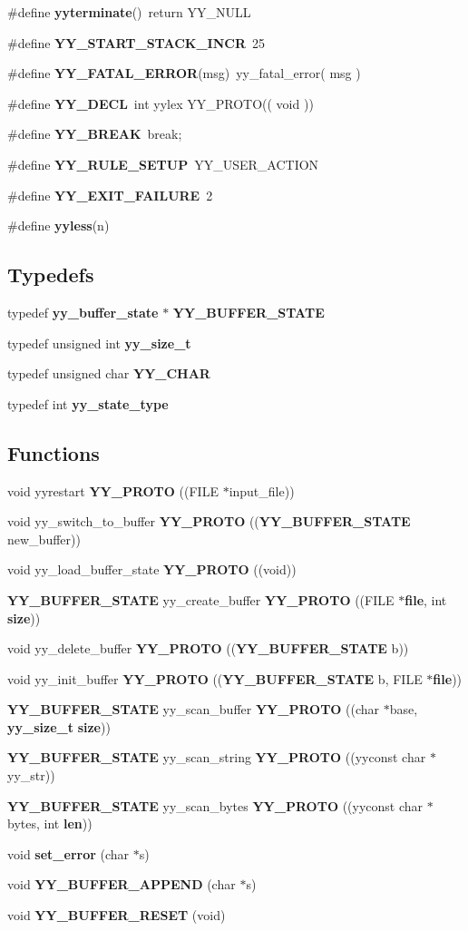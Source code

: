 \begin{CompactItemize}
\item 
\#define {\bf yyterminate}()\ return YY\_\-NULL
\item 
\#define {\bf YY\_\-START\_\-STACK\_\-INCR}\ 25
\item 
\#define {\bf YY\_\-FATAL\_\-ERROR}(msg)\ yy\_\-fatal\_\-error( msg )
\item 
\#define {\bf YY\_\-DECL}\ int yylex YY\_\-PROTO(( void ))
\item 
\#define {\bf YY\_\-BREAK}\ break;
\item 
\#define {\bf YY\_\-RULE\_\-SETUP}\ YY\_\-USER\_\-ACTION
\item 
\#define {\bf YY\_\-EXIT\_\-FAILURE}\ 2
\item 
\#define {\bf yyless}(n)
\end{CompactItemize}
\subsection*{Typedefs}
\begin{CompactItemize}
\item 
typedef {\bf yy\_\-buffer\_\-state} $\ast$ {\bf YY\_\-BUFFER\_\-STATE}
\item 
typedef unsigned int {\bf yy\_\-size\_\-t}
\item 
typedef unsigned char {\bf YY\_\-CHAR}
\item 
typedef int {\bf yy\_\-state\_\-type}
\end{CompactItemize}
\subsection*{Functions}
\begin{CompactItemize}
\item 
void yyrestart {\bf YY\_\-PROTO} ((FILE $\ast$input\_\-file))
\item 
void yy\_\-switch\_\-to\_\-buffer {\bf YY\_\-PROTO} (({\bf YY\_\-BUFFER\_\-STATE} new\_\-buffer))
\item 
void yy\_\-load\_\-buffer\_\-state {\bf YY\_\-PROTO} ((void))
\item 
{\bf YY\_\-BUFFER\_\-STATE} yy\_\-create\_\-buffer {\bf YY\_\-PROTO} ((FILE $\ast${\bf file}, int {\bf size}))
\item 
void yy\_\-delete\_\-buffer {\bf YY\_\-PROTO} (({\bf YY\_\-BUFFER\_\-STATE} b))
\item 
void yy\_\-init\_\-buffer {\bf YY\_\-PROTO} (({\bf YY\_\-BUFFER\_\-STATE} b, FILE $\ast${\bf file}))
\item 
{\bf YY\_\-BUFFER\_\-STATE} yy\_\-scan\_\-buffer {\bf YY\_\-PROTO} ((char $\ast$base, {\bf yy\_\-size\_\-t} {\bf size}))
\item 
{\bf YY\_\-BUFFER\_\-STATE} yy\_\-scan\_\-string {\bf YY\_\-PROTO} ((yyconst char $\ast$yy\_\-str))
\item 
{\bf YY\_\-BUFFER\_\-STATE} yy\_\-scan\_\-bytes {\bf YY\_\-PROTO} ((yyconst char $\ast$bytes, int {\bf len}))
\item 
void {\bf set\_\-error} (char $\ast$s)
\item 
void {\bf YY\_\-BUFFER\_\-APPEND} (char $\ast$s)
\item 
void {\bf YY\_\-BUFFER\_\-RESET} (void)
\end{CompactItemize}
